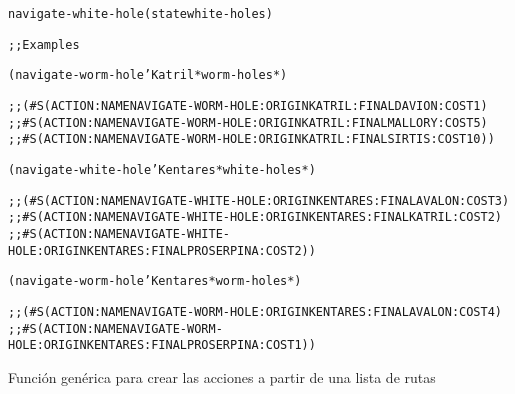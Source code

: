 \begin{aibox}{\function}
\begin{alltt}
navigate-white-hole (state white-holes)



\end{alltt}
\end{aibox}

\begin{aibox}{\examples}
\begin{alltt}
;; Examples

(navigate-worm-hole 'Katril *worm-holes*)

;; (\#S(ACTION :NAME NAVIGATE-WORM-HOLE :ORIGIN KATRIL :FINAL DAVION :COST 1)
;;  \#S(ACTION :NAME NAVIGATE-WORM-HOLE :ORIGIN KATRIL :FINAL MALLORY :COST 5)
;;  \#S(ACTION :NAME NAVIGATE-WORM-HOLE :ORIGIN KATRIL :FINAL SIRTIS :COST 10))

(navigate-white-hole 'Kentares *white-holes*)

;; (\#S(ACTION :NAME NAVIGATE-WHITE-HOLE :ORIGIN KENTARES :FINAL AVALON :COST 3)
;;  \#S(ACTION :NAME NAVIGATE-WHITE-HOLE :ORIGIN KENTARES :FINAL KATRIL :COST 2)
;;  \#S(ACTION :NAME NAVIGATE-WHITE-HOLE :ORIGIN KENTARES :FINAL PROSERPINA :COST 2))

(navigate-worm-hole 'Kentares *worm-holes*)

;; (\#S(ACTION :NAME NAVIGATE-WORM-HOLE :ORIGIN KENTARES :FINAL AVALON :COST 4)
;;  \#S(ACTION :NAME NAVIGATE-WORM-HOLE :ORIGIN KENTARES :FINAL PROSERPINA :COST 1))


\end{alltt}
\end{aibox}

\begin{aibox}{\comments}
Función genérica para crear las acciones a partir de una lista de rutas

\end{aibox}

\begin{aibox}{\pseudocode}
\begin{alltt}

\end{alltt}
\end{aibox}

